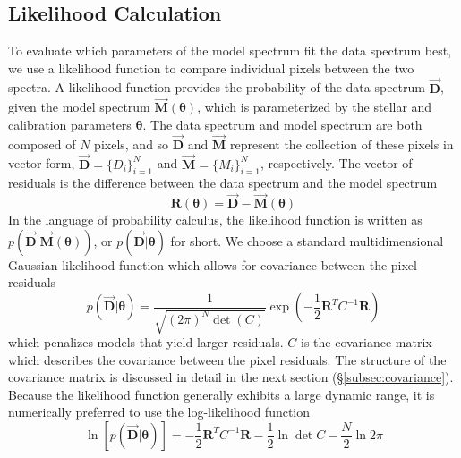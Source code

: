 \documentclass[preprint]{aastex} %
\newcommand{\vt}{ {\bm \theta}}
\newcommand{\fM}{ \vec{{\bm M}}}
\newcommand{\fMi}{M_i}
\newcommand{\fD}{ \vec{{\bm D}}}
\newcommand{\fDi}{D_i}
\newcommand{\fR}{ {\bm R}}
\begin{document}
\subsection{Likelihood Calculation}
\label{subsec:likelihood}

To evaluate which parameters of the model spectrum fit the data spectrum best,
we use a likelihood function to compare individual pixels between the two
spectra. A likelihood function provides the probability of the data spectrum
$\fD$, given the model spectrum $\fM(\vt)$, which is parameterized by the
stellar and calibration parameters $\vt$. The data spectrum and model spectrum are both composed of $N$ pixels, and so $\fD$ and $\fM$ represent the collection of these pixels in vector form, 
$\fD = \{\fDi\}^N_{i=1}$ and $\fM = \{\fMi\}^N_{i=1} $, respectively. The vector of residuals is the difference between the data spectrum and the model spectrum
\begin{equation}
  \fR(\vt) = \fD - \fM(\vt)
\end{equation}
In the language of probability calculus, the likelihood function is written as
$p(\fD | \fM(\vt))$, or $p(\fD | \vt)$ for short. We choose a standard
multidimensional Gaussian likelihood function which allows for covariance
between the pixel residuals 
\begin{equation}
  p(\fD | \vt) = \frac{1}{\sqrt{(2 \pi)^N \det(C)}} \exp\left ( -\frac{1}{2}
   \fR^T C^{-1} \fR \right ) 
   \label{eqn:prob}
\end{equation}
which penalizes models that yield larger residuals. $C$ is the covariance
matrix which describes the covariance between the pixel residuals. The structure of the covariance matrix is discussed in detail in the next section (\S\ref{subsec:covariance}). Because
the likelihood function generally exhibits a large dynamic range, it is numerically
preferred to use the log-likelihood function
\begin{equation}
  \ln[p(\fD | \vt)] = -\frac{1}{2} \fR^T C^{-1} \fR - \frac{1}{2} \ln \det C  
   - \frac{N}{2} \ln 2 \pi 
  \label{eqn:lnprob}
\end{equation}
\end{document}

